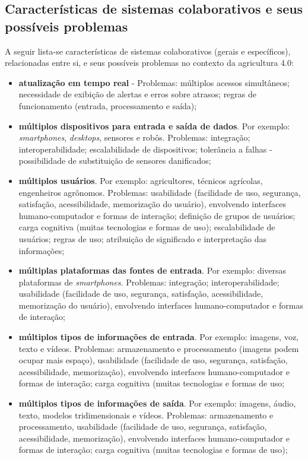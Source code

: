 \documentclass[12pt]{article}
\begin{document}
\subsection{Características de sistemas colaborativos e seus possíveis problemas}
\label{subsec:caracteristicas_problemas}

A seguir lista-se características de sistemas colaborativos (gerais e específicos), relacionadas entre si, e seus possíveis problemas no contexto da agricultura 4.0:

\begin{itemize}
	\item \textbf{atualização em tempo real} - Problemas: múltiplos acessos simultâneos; necessidade de exibição de alertas e erros sobre atrasos; regras de funcionamento (entrada, processamento e saída);
	\item \textbf{múltiplos dispositivos para entrada e saída de dados}. Por exemplo: \textit{smartphones}, \textit{desktops}, sensores e robôs. Problemas: integração; interoperabilidade; escalabilidade de dispositivos; tolerância a falhas - possibilidade de substituição de sensores danificados;
	\item \textbf{múltiplos usuários}. Por exemplo: agricultores, técnicos agrícolas, engenheiros agrônomos. Problemas: usabilidade (facilidade de uso, segurança, satisfação, acessibilidade, memorização do usuário), envolvendo interfaces humano-computador e formas de interação; definição de grupos de usuários; carga cognitiva (muitas tecnologias e formas de uso); escalabilidade de usuários; regras de uso; atribuição de significado e interpretação das informações;
	\item \textbf{múltiplas plataformas das fontes de entrada}. Por exemplo: diversas plataformas de \textit{smartphones}. Problemas: integração; interoperabilidade; usabilidade (facilidade de uso, segurança, satisfação, acessibilidade, memorização do usuário), envolvendo interfaces humano-computador e formas de interação;
	\item \textbf{múltiplos tipos de informações de entrada}. Por exemplo: imagens, voz, texto e vídeos. Problemas: armazenamento e processamento (imagens podem ocupar mais espaço), usabilidade (facilidade de uso, segurança, satisfação, acessibilidade, memorização), envolvendo interfaces humano-computador e formas de interação; carga cognitiva (muitas tecnologias e formas de uso;
	\item \textbf{múltiplos tipos de informações de saída}. Por exemplo: imagens, áudio, texto, modelos tridimensionais e vídeos. Problemas: armazenamento e processamento, usabilidade (facilidade de uso, segurança, satisfação, acessibilidade, memorização), envolvendo interfaces humano-computador e formas de interação; carga cognitiva (muitas tecnologias e formas de uso);

\end{itemize}
\end{document}
